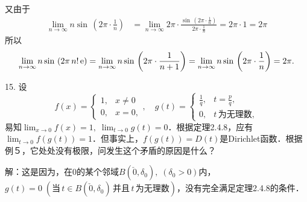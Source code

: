 又由于
\begin{align}
    \lim_{n \to \infty} n \sin \, \left(2 \pi \cdot \displaystyle\frac{1}{n}\right) &= \lim_{n \to \infty} 2 \pi \cdot \displaystyle\frac{\sin \, \left(2\pi \cdot \displaystyle\frac{1}{n}\right)}{2 \pi \cdot \displaystyle\frac{1}{n}} = 2 \pi \cdot 1 = 2 \pi
\end{align}
所以
\begin{equation}
    \lim_{n \to \infty} n \sin \, \left(2 \pi \, n! \, \mathrm{e} \right) = \lim_{n \to \infty} n \sin \, \left(2 \pi \cdot \displaystyle\frac{1}{n+1}\right) = \lim_{n \to \infty} n \sin \, \left(2 \pi \cdot \displaystyle\frac{1}{n}\right) = 2 \pi .
\end{equation}

15. 设
\begin{equation}
    f(x) = \begin{cases}
        1, & x \neq 0 \\
        0, & x = 0,
    \end{cases}, \quad g(t) = \begin{cases}
        \displaystyle\frac{1}{q}, & t = \displaystyle\frac{p}{q}, \\
        0, & t \, \text{为无理数},
    \end{cases}
\end{equation}
易知$\displaystyle\lim_{x \to 0} f(x) = 1, \; \displaystyle\lim_{t \to 0} g(t) = 0$．根据定理2.4.8，应有$\displaystyle\lim_{t \to 0} f(g(t)) = 1$．但事实上，$f(g(t)) = D(t)$是Dirichlet函数．根据例５，它处处没有极限，问发生这个矛盾的原因是什么？

解：这是因为，在$0$的某个邻域$B(\check{0}, \delta_0), \; (\delta_0 > 0)$内，$g(t) = 0 \; (\text{当} \, t \in B(\check{0}, \delta_0) \, \text{并且} \, t \, \text{为无理数})$，没有完全满足定理2.4.8的条件．
